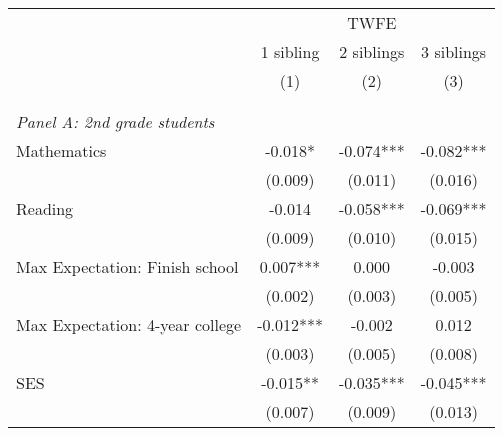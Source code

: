 \makeatletter
{}
{
\makeatother
\begin{tabular}{lccc}
\toprule
\cmidrule(lr){2-4}
& \multicolumn{3}{c}{TWFE}  \\
\cmidrule(lr){2-4}
& 1 sibling & 2 siblings & 3 siblings  \\
\cmidrule(lr){2-2} \cmidrule(lr){3-3} \cmidrule(lr){4-4}
& (1) & (2) & (3)\\
\bottomrule
&  &  &  \\
&  &  &   \\
\multicolumn{4}{l}{\textit{Panel A: 2nd grade students}} \\
\hspace{3mm}Mathematics&      -0.018*  &      -0.074***&      -0.082***\\
                    &     (0.009)   &     (0.011)   &     (0.016)   \\
 
\hspace{3mm}Reading &      -0.014   &      -0.058***&      -0.069***\\
                    &     (0.009)   &     (0.010)   &     (0.015)   \\
 
\hspace{3mm}Max Expectation: Finish school&       0.007***&       0.000   &      -0.003   \\
                    &     (0.002)   &     (0.003)   &     (0.005)   \\
 
\hspace{3mm}Max Expectation: 4-year college&      -0.012***&      -0.002   &       0.012   \\
                    &     (0.003)   &     (0.005)   &     (0.008)   \\
 
\hspace{3mm}SES     &      -0.015** &      -0.035***&      -0.045***\\
                    &     (0.007)   &     (0.009)   &     (0.013)   \\
 

\end{tabular}}
